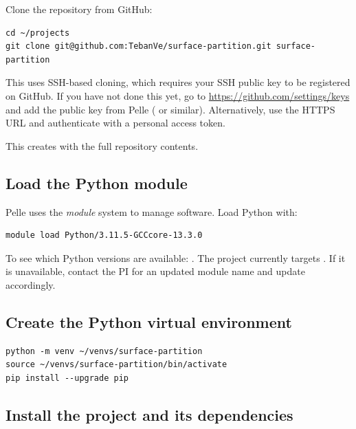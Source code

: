 \documentclass[11pt,a4paper]{article}
\begin{document}
Clone the repository from GitHub:

\begin{lstlisting}[style=shell]
cd ~/projects
git clone git@github.com:TebanVe/surface-partition.git surface-partition
\end{lstlisting}

\begin{notebox}
This uses SSH-based cloning, which requires your SSH public key to be
registered on GitHub.  If you have not done this yet, go to
\url{https://github.com/settings/keys} and add the public key from Pelle
( or similar).  Alternatively,
use the HTTPS URL
 and authenticate
with a personal access token.
\end{notebox}

This creates  with the full
repository contents.

\subsection{Load the Python module}

Pelle uses the \emph{module} system to manage software.  Load Python with:

\begin{lstlisting}[style=shell]
module load Python/3.11.5-GCCcore-13.3.0
\end{lstlisting}

\begin{notebox}
To see which Python versions are available: .
The project currently targets .
If it is unavailable, contact the PI for an updated module name and update
 accordingly.
\end{notebox}

\subsection{Create the Python virtual environment}

\begin{lstlisting}[style=shell]
python -m venv ~/venvs/surface-partition
source ~/venvs/surface-partition/bin/activate
pip install --upgrade pip
\end{lstlisting}

\subsection{Install the project and its dependencies}
\end{document}
